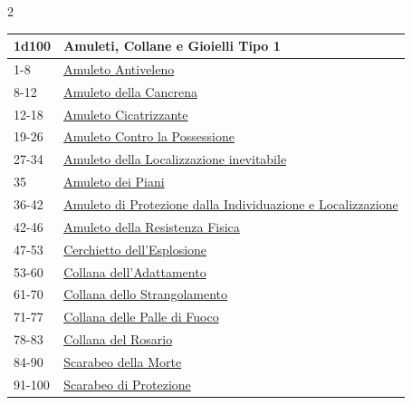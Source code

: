 \begin{multicols}{2}
{{\small\begin{tabularx}{\linewidth}{lX}
		\toprule
\rowcolor{gray!20}\textbf{1d100} & \textbf{Amuleti, Collane e Gioielli Tipo 1}\\
\toprule
1-8 & \hyperlink{Amuleto Antiveleno}{Amuleto Antiveleno}\\
\rowcolor{gray!20}8-12& \hyperlink{Amuleto della Cancrena}{Amuleto della Cancrena}\\
12-18 & \hyperlink{Amuleto Cicatrizzante}{Amuleto Cicatrizzante}\\
\rowcolor{gray!20}19-26 & \hyperlink{Amuleto Contro la Possessione}{Amuleto Contro la Possessione}\\
27-34 & \hyperlink{Amuleto della Localizzazione inevitabile}{Amuleto della Localizzazione inevitabile}\\
\rowcolor{gray!20}35& \hyperlink{Amuleto dei Piani}{Amuleto dei Piani}\\
36-42 & \hyperlink{Amuleto di Protezione dalla Individuazione e Localizzazione}{Amuleto di Protezione dalla Individuazione e Localizzazione}\\
\rowcolor{gray!20}42-46 & \hyperlink{Amuleto della Resistenza Fisica}{Amuleto della Resistenza Fisica}\\
47-53 & \hyperlink{Cerchietto dell'Esplosione}{Cerchietto dell'Esplosione}\\
\rowcolor{gray!20}53-60 & \hyperlink{Collana dell'Adattamento}{Collana dell'Adattamento}\\
61-70 & \hyperlink{Collana dello Strangolamento}{Collana dello Strangolamento}\\
\rowcolor{gray!20}71-77 & \hyperlink{Collana delle Palle di Fuoco}{Collana delle Palle di Fuoco}\\
78-83 & \hyperlink{Collana del Rosario}{Collana del Rosario}\\
\rowcolor{gray!20}84-90 & \hyperlink{Scarabeo della Morte}{Scarabeo della Morte}\\
91-100& \hyperlink{Scarabeo di Protezione}{Scarabeo di Protezione}
\end{tabularx}}

\medskip\hypertarget{amuleticollanegioielli2}{}

}
\end{multicols}
